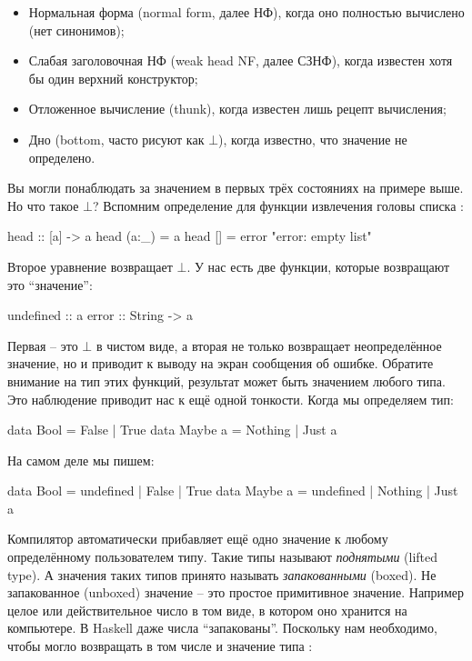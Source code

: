 \begin{itemize}
\item
  Нормальная форма (normal form, далее НФ), когда оно полностью
  вычислено (нет синонимов);
\item
  Слабая заголовочная НФ (weak head NF, далее СЗНФ), когда известен хотя
  бы один верхний конструктор;
\item
  Отложенное вычисление (thunk), когда известен лишь рецепт вычисления;
\item
  Дно (bottom, часто рисуют как $\bot$), когда известно, что значение не
  определено.
\end{itemize}

Вы могли понаблюдать за значением в первых трёх состояниях на примере
выше. Но что такое $\bot$? Вспомним определение для функции извлечения
головы списка :


\begin{code}
head :: [a] -> a
head (a:_)  = a
head []     = error "error: empty list" 
\end{code}

Второе уравнение возвращает $\bot$. У нас есть две функции, которые
возвращают это ``значение'':


\begin{code}
undefined   :: a
error       :: String -> a
\end{code}

Первая -- это $\bot$ в чистом виде, а вторая не только возвращает
неопределённое значение, но и приводит к выводу на экран сообщения об
ошибке. Обратите внимание на тип этих функций, результат может быть
значением любого типа. Это наблюдение приводит нас к ещё одной тонкости.
Когда мы определяем тип:


\begin{code}
data Bool       = False | True
data Maybe a    = Nothing | Just a
\end{code}

На самом деле мы пишем:


\begin{code}
data Bool       = undefined | False | True
data Maybe a    = undefined | Nothing | Just a
\end{code}

Компилятор автоматически прибавляет ещё одно значение к любому
определённому пользователем типу. Такие типы называют \emph{поднятыми}
(lifted type). А значения таких типов принято называть
\emph{запакованными} (boxed). Не запакованное (unboxed) значение -- это
простое примитивное значение. Например целое или действительное число в
том виде, в котором оно хранится на компьютере. В Haskell даже числа
``запакованы''. Поскольку нам необходимо, чтобы  могло
возвращать в том числе и значение типа :


